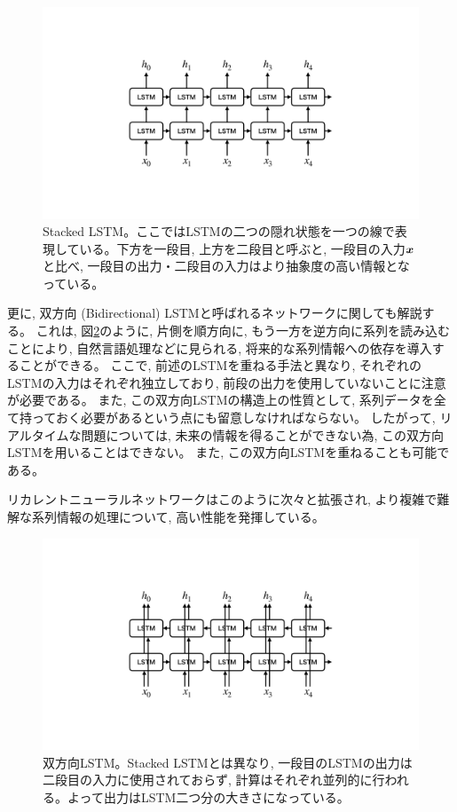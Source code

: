 \begin{figure}[htbp]
 \centering
 \includegraphics[trim = 0 200 0 200, width=1.0\textwidth, clip]{Figure/2DeepLearning/16StackedLSTM.png}
 \caption[Stacked LSTM]{Stacked LSTM。ここではLSTMの二つの隠れ状態を一つの線で表現している。下方を一段目, 上方を二段目と呼ぶと, 一段目の入力${\mbox{\boldmath{$x$}}}$と比べ, 一段目の出力・二段目の入力はより抽象度の高い情報となっている。}
 \label{16StackedLSTM}
\end{figure}

更に, 双方向 (Bidirectional) LSTMと呼ばれるネットワークに関しても解説する。
これは, 図\ref{17BidirectionalLSTM}のように, 片側を順方向に, もう一方を逆方向に系列を読み込むことにより, 自然言語処理などに見られる, 将来的な系列情報への依存を導入することができる。
ここで, 前述のLSTMを重ねる手法と異なり, それぞれのLSTMの入力はそれぞれ独立しており, 前段の出力を使用していないことに注意が必要である。
また, この双方向LSTMの構造上の性質として, 系列データを全て持っておく必要があるという点にも留意しなければならない。
したがって, リアルタイムな問題については, 未来の情報を得ることができない為, この双方向LSTMを用いることはできない。
また, この双方向LSTMを重ねることも可能である。

リカレントニューラルネットワークはこのように次々と拡張され, より複雑で難解な系列情報の処理について, 高い性能を発揮している。

\begin{figure}[htbp]
 \centering
 \includegraphics[trim = 0 200 0 200, width=1.0\textwidth, clip]{Figure/2DeepLearning/17BidirectionalLSTM.png}
 \caption[双方向LSTM]{双方向LSTM。Stacked LSTMとは異なり, 一段目のLSTMの出力は二段目の入力に使用されておらず, 計算はそれぞれ並列的に行われる。よって出力はLSTM二つ分の大きさになっている。}
 \label{17BidirectionalLSTM}
\end{figure}

